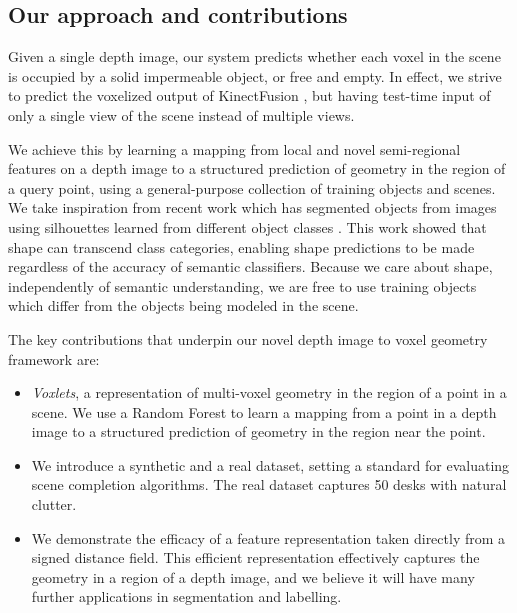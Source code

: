 \documentclass[10pt,twocolumn,letterpaper]{article}
\begin{document}
\subsection{Our approach and contributions}

Given a single depth image, our system predicts whether each voxel in the scene is occupied by a solid impermeable object, or free and empty.
In effect, we strive to predict the voxelized output of KinectFusion \cite{izadi-uist-2011}, but having test-time input of only a single view of the scene instead of multiple views.

We achieve this by learning a mapping from local and novel semi-regional features on a depth image to a structured prediction of geometry in the region of a query point, using a general-purpose collection of training objects and scenes.
We take inspiration from recent work which has segmented objects from images using silhouettes learned from different object classes \cite{kim-eccv-2012}.
This work showed that shape can transcend class categories, enabling shape predictions to be made regardless of the accuracy of semantic classifiers.
Because we care about shape, independently of semantic understanding, we are free to use training objects which differ from the objects being modeled in the scene.

The key contributions that underpin our novel depth image to voxel geometry framework are:
\begin{itemize}
\item \emph{Voxlets}, a representation of multi-voxel geometry in the region of a point in a scene.
We use a Random Forest to learn a mapping from a point in a depth image to a structured prediction of geometry in the region near the point.
\item We introduce a synthetic and a real dataset, setting a standard for evaluating scene completion algorithms.
The real dataset captures 50 desks with natural clutter.
\item We demonstrate the efficacy of a feature representation taken directly from a signed distance field.
This efficient representation effectively captures the geometry in a region of a depth image, and we believe it will have many further applications in segmentation and labelling.
\end{itemize}
\end{document}
